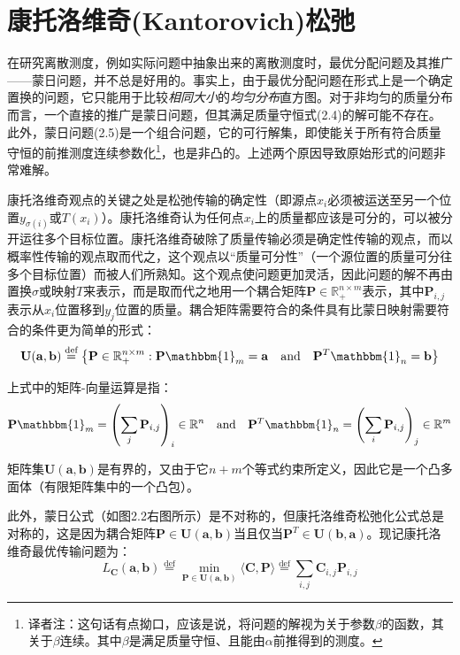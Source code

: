 \documentclass[cn,10pt,math=newtx,citestyle=gb7714-2015,bibstyle=gb7714-2015]{elegantbook}
\begin{document}
\section{康托洛维奇(Kantorovich)松弛}

在研究离散测度，例如实际问题中抽象出来的离散测度时，最优分配问题及其推广——蒙日问题，并不总是好用的。事实上，由于最优分配问题在形式上是一个确定置换的问题，它只能用于比较\textit{相同大小}的\textit{均匀分布}直方图。对于非均匀的质量分布而言，一个直接的推广是蒙日问题，但其满足质量守恒式(2.4)的解可能不存在。此外，蒙日问题(2.5)是一个组合问题，它的可行解集，即使能关于所有符合质量守恒的前推测度连续参数化\footnote{译者注：这句话有点拗口，应该是说，将问题的解视为关于参数$\beta$的函数，其关于$\beta$连续。其中$\beta$是满足质量守恒、且能由$\alpha$前推得到的测度。}，也是非凸的。上述两个原因导致原始形式的问题非常难解。

康托洛维奇观点的关键之处是松弛传输的确定性（即源点$x_i$必须被运送至另一个位置$y_{\sigma(i)}$或$T(x_i)$）。康托洛维奇认为任何点$x_i$上的质量都应该是可分的，可以被分开运往多个目标位置。康托洛维奇破除了质量传输必须是确定性传输的观点，而以概率性传输的观点取而代之，这个观点以“质量可分性”（一个源位置的质量可分往多个目标位置）而被人们所熟知。这个观点使问题更加灵活，因此问题的解不再由置换$\sigma$或映射$T$来表示，而是取而代之地用一个耦合矩阵$\mathbf{P}\in\mathbb{R}_+^{n\times m}$表示，其中$\mathbf{P}_{i,j}$表示从$x_i$位置移到$y_j$位置的质量。耦合矩阵需要符合的条件具有比蒙日映射需要符合的条件更为简单的形式：
\begin{equation}
    \label{2.10}
    \mathbf{U(a,b)}\overset{\text{def}}{=} \left\{ \mathbf{P}\in\mathbb{R}_+^{n\times m}:\mathbf{P}\mathbbm{1}_m=\mathbf{a} \quad \text{and} \quad \mathbf{P}^T\mathbbm{1}_n=\mathbf{b} \right\}
\end{equation}

上式中的矩阵-向量运算是指：
\begin{equation*}
    \mathbf{P}\mathbbm{1}_m=\left( \sum_j \mathbf{P}_{i,j} \right)_i\in \mathbb{R}^n \quad \text{and} \quad \mathbf{P}^T\mathbbm{1}_n=\left(\sum_i \mathbf{P}_{i,j}\right)_j\in \mathbb{R}^m
\end{equation*}

矩阵集$\mathbf{U(a,b)}$是有界的，又由于它$n+m$个等式约束所定义，因此它是一个凸多面体（有限矩阵集中的一个凸包）。

此外，蒙日公式（如图2.2右图所示）是不对称的，但康托洛维奇松弛化公式总是对称的，这是因为耦合矩阵$\mathbf{P}\in\mathbf{U(a,b)}$当且仅当$\mathbf{P}^T\in\mathbf{U(b,a)}$。现记康托洛维奇最优传输问题为：
\begin{equation}
    \label{2.11}
    L_\mathbf{C}(\mathbf{a,b})\overset{\text{def}}{=}\min\limits_{\mathbf{P}\in\mathbf{U(a,b)}} \langle\mathbf{C,P}\rangle \overset{\text{def}}{=} \sum_{i,j} \mathbf{C}_{i,j}\mathbf{P}_{i,j}
\end{equation}
\end{document}

